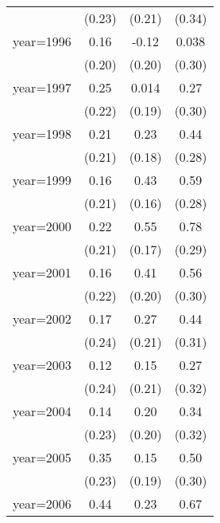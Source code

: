 \begin{sidewaystable}[htbp]
\begin{tabular}{l*{3}{c}}
                &   (0.23)         &   (0.21)         &   (0.34)         \\
\addlinespace
year=1996       &     0.16         &    -0.12         &    0.038         \\
                &   (0.20)         &   (0.20)         &   (0.30)         \\
\addlinespace
year=1997       &     0.25         &    0.014         &     0.27         \\
                &   (0.22)         &   (0.19)         &   (0.30)         \\
\addlinespace
year=1998       &     0.21         &     0.23         &     0.44         \\
                &   (0.21)         &   (0.18)         &   (0.28)         \\
\addlinespace
year=1999       &     0.16         &     0.43\sym{**} &     0.59\sym{**} \\
                &   (0.21)         &   (0.16)         &   (0.28)         \\
\addlinespace
year=2000       &     0.22         &     0.55\sym{***}&     0.78\sym{**} \\
                &   (0.21)         &   (0.17)         &   (0.29)         \\
\addlinespace
year=2001       &     0.16         &     0.41\sym{*}  &     0.56\sym{*}  \\
                &   (0.22)         &   (0.20)         &   (0.30)         \\
\addlinespace
year=2002       &     0.17         &     0.27         &     0.44         \\
                &   (0.24)         &   (0.21)         &   (0.31)         \\
\addlinespace
year=2003       &     0.12         &     0.15         &     0.27         \\
                &   (0.24)         &   (0.21)         &   (0.32)         \\
\addlinespace
year=2004       &     0.14         &     0.20         &     0.34         \\
                &   (0.23)         &   (0.20)         &   (0.32)         \\
\addlinespace
year=2005       &     0.35         &     0.15         &     0.50\sym{*}  \\
                &   (0.23)         &   (0.19)         &   (0.30)         \\
\addlinespace
year=2006       &     0.44\sym{*}  &     0.23         &     0.67\sym{**} \\

\end{tabular}
\end{sidewaystable}
